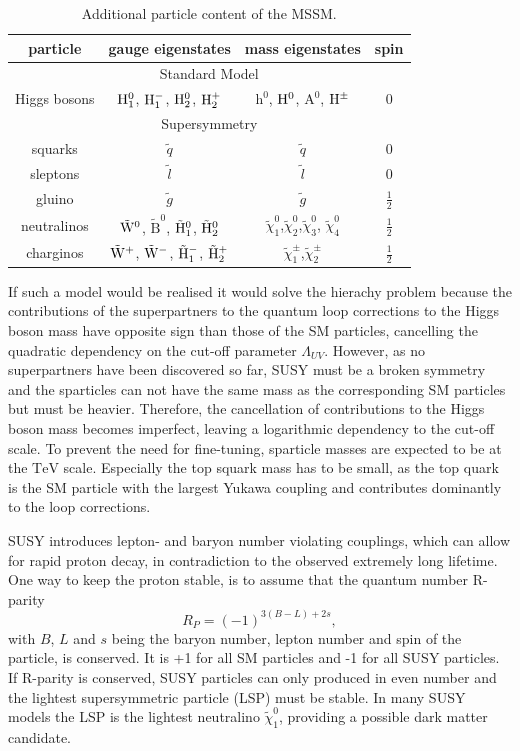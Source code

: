 \begin{table}
\centering
 \renewcommand{\arraystretch}{1.3}
\caption{Additional particle content of the MSSM.}
\label{tab:MSSM}
\begin{tabular}{c|c|c|c}
particle & gauge eigenstates  & mass eigenstates & spin   \\
\hline
\multicolumn{4}{c}{Standard Model} \\
\hline
Higgs bosons & $\mathrm{H}_1^0$, $\mathrm{H}_1^{-}$, $\mathrm{H}_2^0$, $\mathrm{H}_2^+$ & $\mathrm{h}^0$, $\mathrm{H}^0$, $\mathrm{A}^0$, $\mathrm{H}^{\pm}$ & 0 \\
\hline
\multicolumn{4}{c}{Supersymmetry} \\
\hline
squarks & $\tilde{q}$ & $\tilde{q}$ & 0 \\
sleptons & $\tilde{l}$ & $\tilde{l}$ & 0 \\
 gluino & $\tilde{g}$ & $\tilde{g}$ & $\frac{1}{2}$ \\
neutralinos & $\tilde{\mathrm{W}}^0$, $\tilde{\mathrm{B}}^0$, $\tilde{\mathrm{H}}_1^0$, $\tilde{\mathrm{H}}_2^0$ & $\tilde{\chi}^0_1$,$\tilde{\chi}^0_2$,$\tilde{\chi}^0_3$, $\tilde{\chi}^0_4$ & $\frac{1}{2}$\\
charginos & $\tilde{\mathrm{W}}^+$, $\tilde{\mathrm{W}}^-$, $\tilde{\mathrm{H}}_1^-$, $\tilde{\mathrm{H}}_2^+$ & $\tilde{\chi}^{\pm}_1$,$\tilde{\chi}^{\pm}_2$ & $\frac{1}{2}$ \\ 
\end{tabular}
\end{table} 

If such a model would be realised it would solve the hierachy problem because the contributions of the superpartners to the quantum loop corrections to the Higgs boson mass have opposite sign than those of the SM particles, cancelling the quadratic dependency on the cut-off parameter $\Lambda_{UV}$. However, as no superpartners have been discovered so far, SUSY must be a broken symmetry and the sparticles can not have the same mass as the corresponding SM particles but must be heavier. Therefore, the cancellation of contributions to the Higgs boson mass becomes imperfect, leaving a logarithmic dependency to the cut-off scale. To prevent the need for fine-tuning, sparticle masses are expected to be at the $\mathrm{TeV}$ scale. Especially the top squark mass has to be small, as the top quark is the SM particle with the largest Yukawa coupling and contributes dominantly to the loop corrections. 

SUSY introduces lepton- and baryon number violating couplings, which can allow for rapid proton decay, in contradiction to the observed extremely long lifetime. One way to keep the proton stable, is to assume that the quantum number R-parity
\begin{equation}
R_P = (-1)^{3(B-L)+2s},
\end{equation} 
with $B$, $L$ and $s$ being the baryon number, lepton number and spin of the particle, is conserved. It is +1 for all SM particles and -1 for all SUSY particles. If R-parity is conserved, SUSY particles can only produced in even number and the lightest supersymmetric particle (LSP) must be stable. In many SUSY models the LSP is the lightest neutralino $\tilde{\chi}^0_1$, providing a possible dark matter candidate. 


